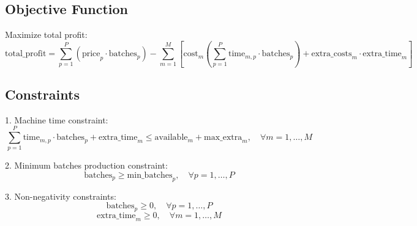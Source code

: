 \documentclass{article}
\begin{document}
\subsection*{Objective Function}
Maximize total profit:
\[
\text{total\_profit} = \sum_{p=1}^{P} \left( \text{price}_{p} \cdot \text{batches}_{p} \right) - \sum_{m=1}^{M} \left[ \text{cost}_{m} \left( \sum_{p=1}^{P} \text{time}_{m,p} \cdot \text{batches}_{p} \right) + \text{extra\_costs}_{m} \cdot \text{extra\_time}_{m} \right]
\]

\subsection*{Constraints}
1. Machine time constraint:
\[
\sum_{p=1}^{P} \text{time}_{m,p} \cdot \text{batches}_{p} + \text{extra\_time}_{m} \leq \text{available}_{m} + \text{max\_extra}_{m}, \quad \forall m = 1, \ldots, M
\]

2. Minimum batches production constraint:
\[
\text{batches}_{p} \geq \text{min\_batches}_{p}, \quad \forall p = 1, \ldots, P
\]

3. Non-negativity constraints:
\[
\text{batches}_{p} \geq 0, \quad \forall p = 1, \ldots, P
\]
\[
\text{extra\_time}_{m} \geq 0, \quad \forall m = 1, \ldots, M
\]
\end{document}
